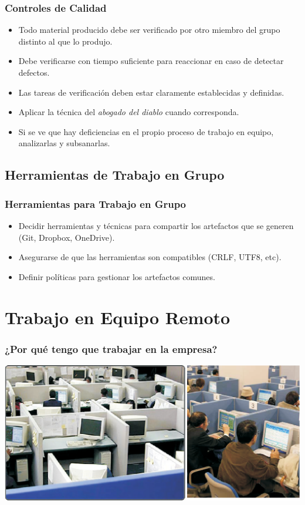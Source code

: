 \documentclass[a4paper,slidestop,xcolor=pst,dvips,blue]{beamer}
\begin{document}
\begin{frame}[c]
	\frametitle{Controles de Calidad}
	\begin{itemize}[<+->]
		\item Todo material producido debe ser verificado por otro miembro del grupo distinto al que lo produjo.
		\item Debe verificarse con tiempo suficiente para reaccionar en caso de detectar defectos.
		\item Las tareas de verificación deben estar claramente establecidas y definidas.
		\item Aplicar la técnica del \emph{abogado del diablo} cuando corresponda.
		\item Si se ve que hay deficiencias en el propio proceso de trabajo en equipo, analizarlas y subsanarlas.
	\end{itemize}
\end{frame}

\subsection{Herramientas de Trabajo en Grupo}

\begin{frame}[c]
	\frametitle{Herramientas para Trabajo en Grupo}
	\begin{itemize}[<+->]
		\item Decidir herramientas y técnicas para compartir los artefactos que se generen (Git, Dropbox, OneDrive).
		\item Asegurarse de que las herramientas son compatibles (CRLF, UTF8, etc).
		\item Definir políticas para gestionar los artefactos comunes.
	\end{itemize}
\end{frame}

\section{Trabajo en Equipo Remoto}

\begin{frame}[c]
	\frametitle{¿Por qué tengo que trabajar en la empresa?}
	\begin{center}
\includegraphics[width=\linewidth,keepaspectratio=true]{images/realidad.eps}
	\end{center}
\end{frame}
\end{document}
